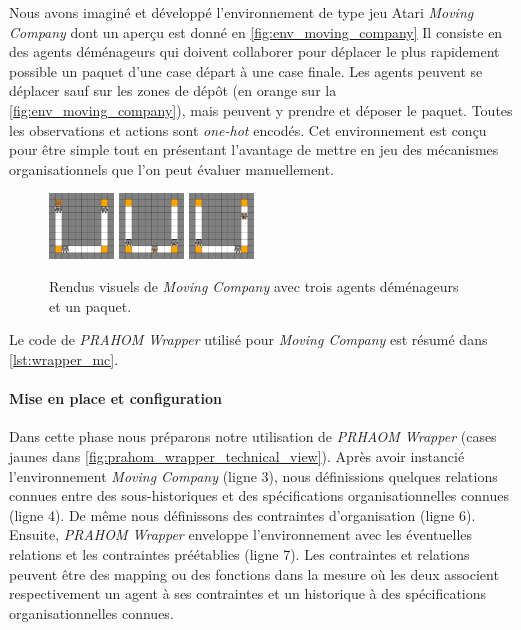 \documentclass[demonstration]{jfsma}
\newcommand{\jp}[1]{\textbf{\color{red} JPJ: #1}}
\newcounter{relation}
\begin{document}
Nous avons imaginé et développé l'environnement de type jeu Atari \emph{Moving Company} dont un aperçu est donné en \autoref{fig:env_moving_company}
Il consiste en des agents déménageurs qui doivent collaborer pour déplacer le plus rapidement possible un paquet d'une case départ à une case finale. Les agents peuvent se déplacer sauf sur les zones de dépôt (en orange sur la \autoref{fig:env_moving_company}), mais peuvent y prendre et déposer le paquet. Toutes les observations et actions sont \emph{one-hot} encodés. Cet environnement est conçu pour être simple tout en présentant l'avantage de mettre en jeu des mécanismes organisationnels que l'on peut évaluer manuellement.
%
\begin{figure}[h!]
  \centering
  \includegraphics[width=0.154\textwidth]{figures/moving_company_1.png}
  \includegraphics[width=0.154\textwidth]{figures/moving_company_2.png}
  \includegraphics[width=0.154\textwidth]{figures/moving_company_3.png}
  \caption{Rendus visuels de \emph{Moving Company} avec trois agents déménageurs et un paquet.}
  \label{fig:env_moving_company}
\end{figure}
%
Le code de \emph{PRAHOM Wrapper} utilisé pour \emph{Moving Company} est résumé dans \autoref{lst:wrapper_mc}.

\paragraph{Mise en place et configuration}

Dans cette phase nous préparons notre utilisation de \emph{PRHAOM Wrapper} (cases jaunes dans \autoref{fig:prahom_wrapper_technical_view}).
Après avoir instancié l'environnement \emph{Moving Company} (ligne 3), nous définissions quelques relations connues entre des sous-historiques et des spécifications organisationnelles connues (ligne 4). De même nous définissons des contraintes d'organisation (ligne 6). Ensuite, \emph{PRAHOM Wrapper} enveloppe l'environnement avec les éventuelles relations et les contraintes préétablies (ligne 7). Les contraintes et relations peuvent être des mapping ou des fonctions dans la mesure où les deux associent respectivement un agent à ses contraintes et un historique à des spécifications organisationnelles connues.
\end{document}
